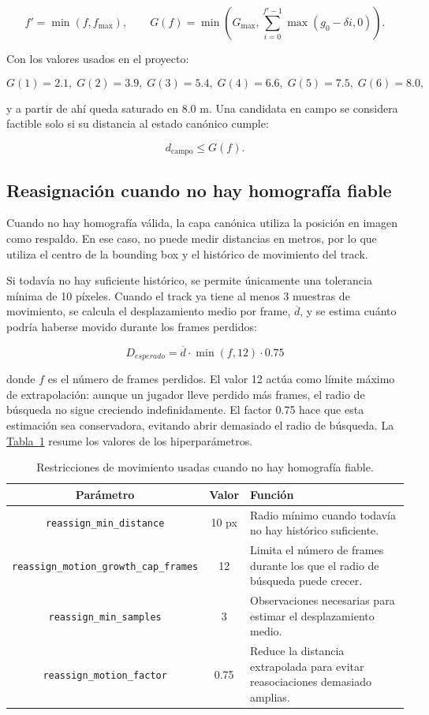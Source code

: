 \[
f'=\min(f,f_{\max}),
\qquad
G(f)=\min\!\left(
G_{\max},
\sum_{i=0}^{f'-1}\max(g_0-\delta i,0)
\right).
\]

Con los valores usados en el proyecto:

\[
G(1)=2.1,\;
G(2)=3.9,\;
G(3)=5.4,\;
G(4)=6.6,\;
G(5)=7.5,\;
G(6)=8.0,
\]

y a partir de ahí queda saturado en \(8.0\) m. Una candidata en campo se considera factible solo si su distancia al estado canónico cumple:

\[
d_{\text{campo}} \leq G(f).
\]

\subsection{Reasignación cuando no hay homografía fiable}
\label{subsec:reasignacion-sin-homografia}

Cuando no hay homografía válida, la capa canónica utiliza la posición en imagen como respaldo. En ese caso, no puede medir distancias en metros, por lo que utiliza el centro de la bounding box y el histórico de movimiento del track.

Si todavía no hay suficiente histórico, se permite únicamente una tolerancia mínima de 10 píxeles. Cuando el track ya tiene al menos 3 muestras de movimiento, se calcula el desplazamiento medio por frame, $\overline{d}$, y se estima cuánto podría haberse movido durante los frames perdidos:

\[
D_{esperado} =
\overline{d} \cdot \min(f,12) \cdot 0.75
\]

donde $f$ es el número de frames perdidos. El valor 12 actúa como límite máximo de extrapolación: aunque un jugador lleve perdido más frames, el radio de búsqueda no sigue creciendo indefinidamente. El factor 0.75 hace que esta estimación sea conservadora, evitando abrir demasiado el radio de búsqueda. La \hyperref[tab:movimiento-imagen]{Tabla~\ref*{tab:movimiento-imagen}} resume los valores de los hiperparámetros.

\begin{table}[htbp]
    \centering
    \scriptsize
    \begin{tabular}{c|c|p{7.5cm}}
        \textbf{Parámetro} & \textbf{Valor} & \textbf{Función} \\
        \hline\hline
        \texttt{reassign\_min\_distance} & 10 px & Radio mínimo cuando todavía no hay histórico suficiente. \\
        \texttt{reassign\_motion\_growth\_cap\_frames} & 12 & Limita el número de frames durante los que el radio de búsqueda puede crecer. \\
        \texttt{reassign\_min\_samples} & 3 & Observaciones necesarias para estimar el desplazamiento medio. \\
        \texttt{reassign\_motion\_factor} & 0.75 & Reduce la distancia extrapolada para evitar reasociaciones demasiado amplias. \\
        \hline
    \end{tabular}
    \caption{Restricciones de movimiento usadas cuando no hay homografía fiable.}
    \label{tab:movimiento-imagen}
\end{table}

